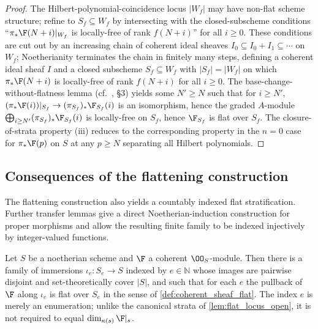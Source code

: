 \begin{proof}
  The Hilbert-polynomial-coincidence locus \(|W_f|\) may have non-flat scheme
  structure; refine to \(S_f \subseteq W_f\) by intersecting with the
  closed-subscheme conditions ``\(\pi_* \F(N+i)|_{W_f}\) is locally-free of rank
  \(f(N+i)\)'' for all \(i \ge 0\).  These conditions are cut out by an increasing
  chain of coherent ideal sheaves \(I_0 \subseteq I_0 + I_1 \subseteq \cdots\) on
  \(W_f\); Noetherianity terminates the chain in finitely many steps, defining a
  coherent ideal sheaf \(I\) and a closed subscheme \(S_f \subseteq W_f\) with
  \(|S_f| = |W_f|\) on which \(\pi_* \F(N+i)\) is locally-free of rank \(f(N+i)\)
  for all \(i \ge 0\). The base-change-without-flatness lemma (cf.\ \cite{nitsure-hilbert-quot},
  \S3) yields some \(N' \ge N\) such that for \(i \ge N'\),
  \((\pi_* \F(i))|_{S_f} \to (\pi_{S_f})_* \F_{S_f}(i)\) is an isomorphism, hence
  the graded \(A\)-module \(\bigoplus_{i \ge N'} (\pi_{S_f})_* \F_{S_f}(i)\) is
  locally-free on \(S_f\), hence \(\F_{S_f}\) is flat over \(S_f\). The
  closure-of-strata property (iii) reduces to the corresponding property in
  the \(n=0\) case for \(\pi_* \F(p)\) on \(S\) at any \(p \ge N\) separating all
  Hilbert polynomials.
\end{proof}

\subsection{Consequences of the flattening construction}
\label{sec:flatstrat_lean_helpers}

The flattening construction also yields a countably indexed flat
stratification.  Further transfer lemmas give a direct Noetherian-induction
construction for proper morphisms and allow the resulting finite family to
be indexed injectively by integer-valued functions.

\begin{lemma}[Flat-locus stratification, special case \(n = 0\)]\leanok
  \label{lem:flat_locus_stratification_lean}
  Let \(S\) be a noetherian scheme and \(\F\) a coherent \(\OO_S\)-module.
  Then there is a family of immersions \(\iota_e : S_e \to S\) indexed by
  \(e \in \mathbb{N}\) whose images are pairwise disjoint and set-theoretically
  cover \(|S|\), and such that for each \(e\) the pullback of \(\F\) along
  \(\iota_e\) is flat over \(S_e\) in the sense of
  \cref{def:coherent_sheaf_flat}.  The index \(e\) is merely an enumeration;
  unlike the canonical strata of \cref{lem:flat_locus_open}, it is not
  required to equal \(\dim_{\kappa(s)} \F|_s\).
\end{lemma}

